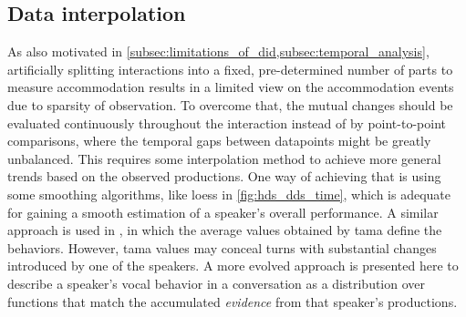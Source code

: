 \begin{description}
%	
\end{description}

\subsection[Data interpolation using kriging]{Data interpolation}
\label{subsec:interploating_data_using_kriging}

As also motivated in \cref{subsec:limitations_of_did,subsec:temporal_analysis}, artificially splitting interactions into a fixed, pre-determined number of parts to measure accommodation results in a limited view on the accommodation events due to sparsity of observation.
To overcome that, the mutual changes should be evaluated continuously throughout the interaction instead of by point-to-point comparisons, where the temporal gaps between datapoints might be greatly unbalanced.
This requires some interpolation method to achieve more general trends based on the observed productions.
One way of achieving that is using some smoothing algorithms, like \ac{loess} in \cref{fig:hds_dds_time}, which is adequate for gaining a smooth estimation of a speaker's overall performance.
A similar approach is used in \citet{Galvez2020unifiying}, in which the average values obtained by \acl{tama} \citep[\acs{tama};][]{Kousidis2008towards, Kousidis2009monitoring} define the behaviors.
However, \ac{tama} values may conceal turns with substantial changes introduced by one of the speakers.
A more evolved approach is presented here to describe a speaker's vocal behavior in a conversation as a distribution over functions that match the accumulated \textit{evidence} from that speaker's productions.

